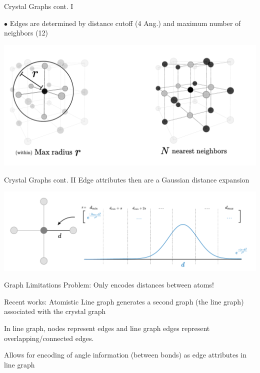 \documentclass[11pt]{beamer}
\begin{document}
\begin{frame}{Crystal Graphs cont. I}

$\bullet$ Edges are determined by distance cutoff (4 Ang.) and maximum number of neighbors (12)

\begin{center}
\includegraphics[scale=0.45]{ex_bondcriteria.pdf}
\end{center}
\end{frame}

\begin{frame}{Crystal Graphs cont. II}
Edge attributes then are a Gaussian distance expansion

\begin{center}
\includegraphics[scale=0.33]{bond_feat.pdf}
\end{center}
\end{frame}

\begin{frame}{Graph Limitations}
Problem: Only encodes distances between atoms!

\vspace{.7cm}

Recent works: Atomistic Line graph generates a second graph (the line graph) associated with the crystal graph

\vspace{.4cm}

In line graph, nodes represent edges and line graph edges represent overlapping/connected edges.

\vspace{.4cm} 

Allows for encoding of angle information (between bonds) as edge attributes in line graph
\end{frame} 
\end{document}
